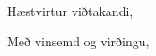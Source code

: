 \documentclass[11pt,icelandic,a4paper]{letter}
\begin{document}
\begin{letter}{}
\opening{Hæstvirtur viðtakandi,}

\lipsum[1]

\flushright\closing{Með vinsemd og virðingu,}
\end{letter}
\end{document}
